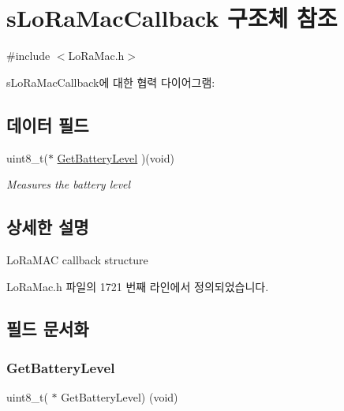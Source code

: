 \hypertarget{structs_lo_ra_mac_callback}{}\section{s\+Lo\+Ra\+Mac\+Callback 구조체 참조}
\label{structs_lo_ra_mac_callback}


{\ttfamily \#include $<$Lo\+Ra\+Mac.\+h$>$}



s\+Lo\+Ra\+Mac\+Callback에 대한 협력 다이어그램\+:
\subsection*{데이터 필드}
\begin{DoxyCompactItemize}
\item 
uint8\+\_\+t($\ast$ \mbox{\hyperlink{structs_lo_ra_mac_callback_ae0f26df23b50220cf30bc5a1db6bfefa}{Get\+Battery\+Level}} )(void)
\begin{DoxyCompactList}\small\item\em Measures the battery level \end{DoxyCompactList}\end{DoxyCompactItemize}


\subsection{상세한 설명}
Lo\+Ra\+M\+AC callback structure 

Lo\+Ra\+Mac.\+h 파일의 1721 번째 라인에서 정의되었습니다.



\subsection{필드 문서화}
\mbox{\label{structs_lo_ra_mac_callback_ae0f26df23b50220cf30bc5a1db6bfefa}} 
\subsubsection{\texorpdfstring{Get\+Battery\+Level}{GetBatteryLevel}}
{\footnotesize\ttfamily uint8\+\_\+t( $\ast$ Get\+Battery\+Level) (void)}




